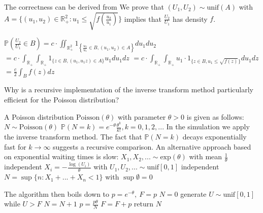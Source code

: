 The correctness can be derived from
We prove that \((U_1, U_2) \sim \text{unif}(A)\) with \(A = \{ (u_1, u_2) \in \mathbb{R}^2_+ : u_1 \leq \sqrt{f \left( \frac{u_2}{u_1} \right) } \}\) implies that 
\(\frac{U_2}{U_1}\) has density \(f\).

\( \mathbb{P} \left( \frac{U_2}{U_1} \in B \right) = c \cdot \iint_{\mathbb{R}_+^2} 1_{\left\{ \frac{u_2}{u_1} \in B, (u_1, u_2) \in A \right\}} du_1 du_2 \)
\( = c \cdot \int_{\mathbb{R}_+} \int_{\mathbb{R}_+} 1_{\{ z \in B, (u_1, u_1 z) \in A \}} u_1 du_1 dz \)
\( = c \cdot \int_{\mathbb{R}_+} \int_{\mathbb{R}_+} u_1 \cdot 1_{\{ z \in B, u_1 \le \sqrt{f(z)} \}} du_1 dz \)
\( = \frac{c}{2} \int_B f(z) dz \)


Why is a recursive implementation of the inverse transform method particularly
efficient for the Poisson distribution?

A Poisson distribution \( \text{Poisson}(\theta) \) with parameter \(\theta > 0\) is given as follows:
\( N \sim \text{Poisson}(\theta) \)
\( \mathbb{P}(N = k) = e^{-\theta} \frac{\theta^k}{k!}, k = 0, 1, 2, ... \)
In the simulation we apply the inverse transform method.
The fact that \( \mathbb{P}(N = k) \) decays exponentially fast for \( k \to \infty \) suggests a recursive comparison.
An alternative approach based on exponential waiting times is slow:
\( X_1, X_2, ... \sim \text{exp}(\theta) \) with mean \(\frac{1}{\theta}\) independent
\( X_i = - \frac{\log(U_i)}{\theta} \) with \( U_1, U_2, ... \sim \text{unif}[0, 1] \) independent
\( N = \sup \{ n: X_1 + ... + X_n < 1 \} \) with \( \sup \emptyset = 0 \)

The algorithm then boils down to
\( p = e^{-\theta},\ F = p \)
\( N = 0 \)
generate \( U \sim \text{unif}[0, 1] \)
while \( U > F \)
\( N = N + 1 \)
\( p = \frac{p\theta}{N} \)
\( F = F + p \)
return \( N \)


